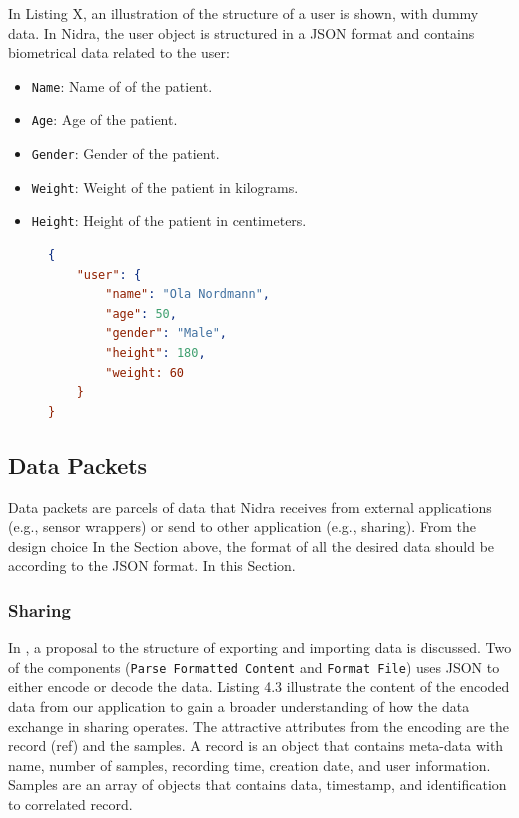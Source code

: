 In Listing X, an illustration of the structure of a user is shown, with  dummy data. In Nidra, the user object is structured in a JSON format and contains biometrical data related to the user: 
\begin{itemize}
    \item \verb|Name|: Name of of the patient.
    \item \verb|Age|: Age of the patient.
    \item \verb|Gender|: Gender of the patient.
    \item \verb|Weight|: Weight of the patient in kilograms.
    \item \verb|Height|: Height of the patient in centimeters.
\end{itemize}

\begin{figure}
\begin{lstlisting}[language=json, caption={My Caption}, captionpos=b]
{
    "user": {
        "name": "Ola Nordmann",
        "age": 50,
        "gender": "Male",
        "height": 180,
        "weight: 60
    }
}
\end{lstlisting}
\end{figure}


\subsection{Data Packets}
Data packets are parcels of data that Nidra receives from external applications (e.g., sensor wrappers) or send to other application (e.g., sharing). From the design choice In the Section above, the format of all the desired data should be according to the JSON format.  In this Section.

\subsubsection{Sharing}

In , a proposal to the structure of exporting and importing data is discussed. Two of the components (\verb|Parse Formatted Content| and \verb|Format File|) uses JSON to either encode or decode the data. Listing 4.3 illustrate the content of the encoded data from our application to gain a broader understanding of how the data exchange in sharing operates. The attractive attributes from the encoding are the record (ref) and the samples.  A record is an object that contains meta-data with name, number of samples, recording time, creation date, and user information. Samples are an array of objects that contains data, timestamp, and identification to correlated record. 

